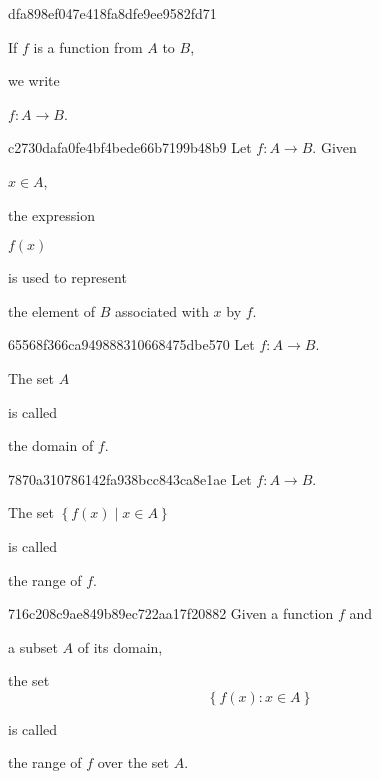 \begin{note}{dfa898ef047e418fa8dfe9ee9582fd71}
    \begin{icloze}{1}If \({ f }\) is a function from \({ A }\) to \({ B }\),\end{icloze} we write \begin{icloze}{2}\({ f : A \to B }\).\end{icloze}
\end{note}

\begin{note}{c2730dafa0fe4bf4bede66b7199b48b9}
    Let \({ f : A \to B }\).
    Given \begin{icloze}{3}\({ x \in A }\),\end{icloze} the expression \begin{icloze}{2}\({ f(x) }\)\end{icloze} is used to represent \begin{icloze}{1}the element of \({ B }\) associated with \({ x }\) by \({ f }\).\end{icloze}
\end{note}

\begin{note}{65568f366ca949888310668475dbe570}
    Let \({ f : A \to B }\).
    \begin{icloze}{2}The set \({ A }\)\end{icloze} is called \begin{icloze}{1}the domain of \({ f }\).\end{icloze}
\end{note}

\begin{note}{7870a310786142fa938bcc843ca8e1ae}
    Let \({ f : A \to B }\).
    \begin{icloze}{2}The set \({ \left\{ f(x) \mid x \in A \right\} }\)\end{icloze} is called \begin{icloze}{1}the range of \({ f }\).\end{icloze}
\end{note}

\begin{note}{716c208c9ae849b89ec722aa17f20882}
    Given a function \({ f }\) and \begin{icloze}{3}a subset \({ A }\) of its domain,\end{icloze}
    \begin{icloze}{2}
        the set
        \[
            \left\{ f(x) : x \in A \right\}
        \]
    \end{icloze}
    is called \begin{icloze}{1}the range of \({ f }\) over the set \({ A }\).\end{icloze}
\end{note}

